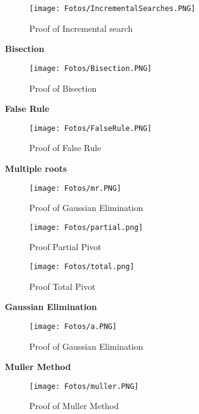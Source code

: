 \documentclass[letterpaper,12pt]{article}
\begin{document}
\begin{figure}[H]
  \texttt{[image: Fotos/IncrementalSearches.PNG]}
  \caption{Proof of Incremental search}
  \label{fig:cond}
\end{figure}

\BlankLine

\textbf{Bisection} \\


\begin{figure}[H]
  \texttt{[image: Fotos/Bisection.PNG]}
  \caption{Proof of Bisection}
  \label{fig:cond}
\end{figure}

\BlankLine
\textbf{False Rule} \\


\begin{figure}[H]
  \texttt{[image: Fotos/FalseRule.PNG]}
  \caption{Proof of False Rule}
  \label{fig:cond}
\end{figure}

\BlankLine

\textbf{Multiple roots} \\


\begin{figure}[H]
  \texttt{[image: Fotos/mr.PNG]}
  \caption{Proof of Gaussian Elimination}
  \label{fig:cond}
\end{figure}

\BlankLine

\begin{figure}[H]
  \texttt{[image: Fotos/partial.png]}
  \caption{Proof Partial Pivot}
  \label{fig:cond}
\end{figure}

\BlankLine

\begin{figure}[H]
  \texttt{[image: Fotos/total.png]}
  \caption{Proof Total Pivot}
  \label{fig:cond}
\end{figure}

\BlankLine


\textbf{Gaussian Elimination}

\begin{figure}[H]
  \texttt{[image: Fotos/a.PNG]}
  \caption{Proof of Gaussian Elimination}
  \label{fig:cond}
\end{figure}

\textbf{Muller Method}

\begin{figure}[H]
  \texttt{[image: Fotos/muller.PNG]}
  \caption{Proof of Muller Method}
  \label{fig:cond}
\end{figure}
\textbf{\textbf{\textbf{}}}
\end{document}
